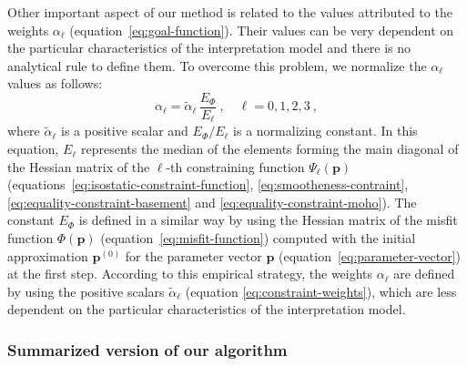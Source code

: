 \documentclass[manuscript]{geophysics}
\begin{document}
Other important aspect of our method is related to the values attributed to 
the weights $\alpha_{\ell}$ (equation~\ref{eq:goal-function}).
Their values can be very dependent on the particular characteristics of the 
interpretation model and there is no analytical rule to define them. 
To overcome this problem, we normalize the $\alpha_{\ell}$ values as follows:
\begin{equation}
\alpha_{\ell} = \tilde{\alpha}_{\ell} \, \frac{E_{\Phi}}{E_{\ell}} \: 
, \quad \ell = 0, 1, 2, 3 \: ,
\label{eq:constraint-weights}
\end{equation}
where $\tilde{\alpha}_{\ell}$ is a positive scalar and $E_{\Phi} / E_{\ell}$
is a normalizing constant. In this equation, $E_{\ell}$ represents the median 
of the elements forming the main diagonal of the Hessian matrix of the 
$\ell$-th constraining function $\Psi_{\ell}(\mathbf{p})$ 
(equations~\ref{eq:isostatic-constraint-function}, 
\ref{eq:smootheness-contraint}, \ref{eq:equality-constraint-basement} and 
\ref{eq:equality-constraint-moho}). The constant $E_{\Phi}$ is defined in 
a similar way by using the Hessian matrix of the misfit function $\Phi(\mathbf{p})$ 
(equation~\ref{eq:misfit-function}) computed with 
the initial approximation $\mathbf{p}^{(0)}$ for the parameter vector $\mathbf{p}$ 
(equation~\ref{eq:parameter-vector}) at the first step.
According to this empirical strategy, the weights $\alpha_{\ell}$ are defined 
by using the positive scalars $\tilde{\alpha}_{\ell}$ 
(equation \ref{eq:constraint-weights}), which are less dependent on the particular 
characteristics of the interpretation model.

\subsubsection{Summarized version of our algorithm}
\end{document}
